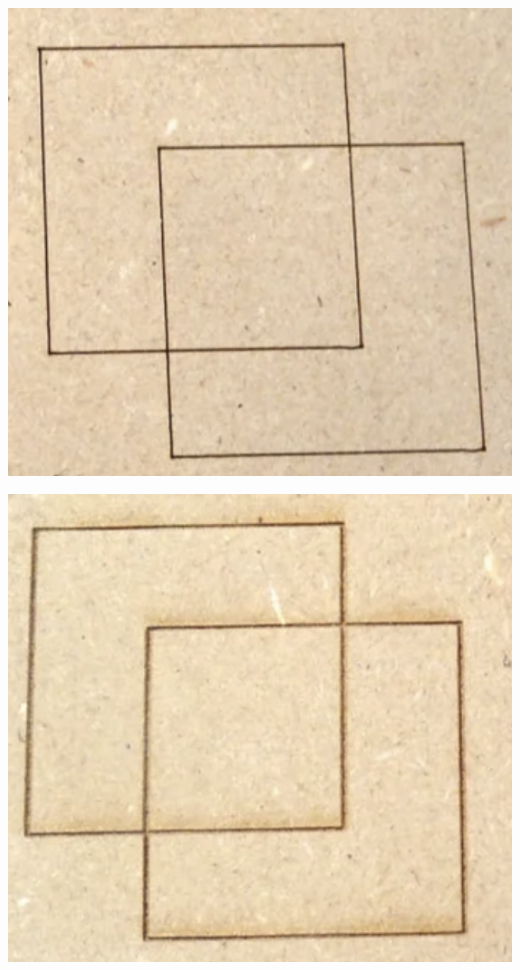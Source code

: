 \noindent
\begin{minipage}{0.45\textwidth}
	\includegraphics[width=\linewidth]{Images/vector.png}
	\centering
	\label{vector} 
\end{minipage}
\hfill
\begin{minipage}{0.45\textwidth}
	\includegraphics[width=\linewidth]{Images/raster.png}
	\centering
	\label{raster}
\end{minipage}

